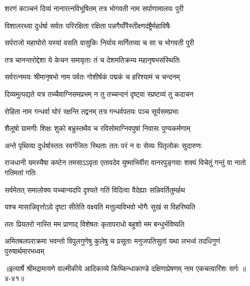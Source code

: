 \twolineshloka
{शरणं काञ्चनं दिव्यं नानारत्नविभूषितम्}
{तत्र भोगवती नाम सर्पाणामालयः पुरी} %

\twolineshloka
{विशालरथ्या दुर्धर्षा सर्वतः परिरक्षिता}
{रक्षिता पन्नगैर्घोरैस्तीक्ष्णदंष्ट्रैर्महाविषैः} %

\twolineshloka
{सर्पराजो महाघोरो यस्यां वसति वासुकिः}
{निर्याय मार्गितव्या च सा च भोगवती पुरी} %

\twolineshloka
{तत्र चानन्तरोद्देशा ये केचन समावृताः}
{तं च देशमतिक्रम्य महानृषभसंस्थितिः} %

\twolineshloka
{सर्वरत्नमयः श्रीमानृषभो नाम पर्वतः}
{गोशीर्षकं पद्मकं च हरिश्यामं च चन्दनम्} %

\twolineshloka
{दिव्यमुत्पद्यते यत्र तच्चैवाग्निसमप्रभम्}
{न तु तच्चन्दनं दृष्ट्वा स्प्रष्टव्यं तु कदाचन} %

\twolineshloka
{रोहिता नाम गन्धर्वा घोरं रक्षन्ति तद्वनम्}
{तत्र गन्धर्वपतयः पञ्च सूर्यसमप्रभाः} %

\twolineshloka
{शैलूषो ग्रामणीः शिक्षः शुको बभ्रुस्तथैव च}
{रविसोमाग्निवपुषां निवासः पुण्यकर्मणाम्} %

\twolineshloka
{अन्ते पृथिव्या दुर्धर्षास्ततः स्वर्गजितः स्थिताः}
{ततः परं न वः सेव्यः पितृलोकः सुदारुणः} %

\threelineshloka
{राजधानी यमस्यैषा कष्टेन तमसाऽऽवृता}
{एतावदेव युष्माभिर्वीरा वानरपुङ्गवाः}
{शक्यं विचेतुं गन्तुं वा नातो गतिमतां गतिः} %

\twolineshloka
{सर्वमेतत् समालोक्य यच्चान्यदपि दृश्यते}
{गतिं विदित्वा वैदेह्याः सन्निवर्तितुमर्हथ} %

\twolineshloka
{यश्च मासान्निवृत्तोऽग्रे दृष्टा सीतेति वक्ष्यति}
{मत्तुल्यविभवो भोगैः सुखं स विहरिष्यति} %

\twolineshloka
{ततः प्रियतरो नास्ति मम प्राणाद् विशेषतः}
{कृतापराधो बहुशो मम बन्धुर्भविष्यति} %

\twolineshloka
{अमितबलपराक्रमा भवन्तो विपुलगुणेषु कुलेषु च प्रसूताः}
{मनुजपतिसुतां यथा लभध्वं तदधिगुणं पुरुषार्थमारभध्वम्} %


॥इत्यार्षे श्रीमद्रामायणे वाल्मीकीये आदिकाव्ये किष्किन्धाकाण्डे दक्षिणाप्रेषणम् नाम एकचत्वारिंशः सर्गः ॥४-४१॥
